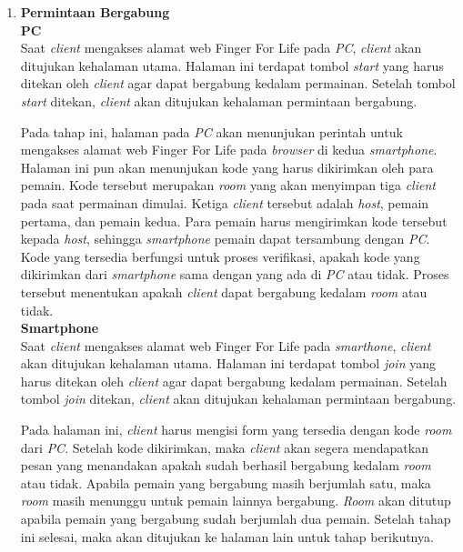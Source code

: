 \begin{enumerate}
	\item \textbf{Permintaan Bergabung} \\
	
	\textbf{PC} \\
	Saat \textit{client} mengakses alamat web Finger For Life pada \textit{PC}, \textit{client} akan ditujukan kehalaman utama. Halaman ini terdapat tombol \textit{start} yang harus ditekan oleh \textit{client} agar dapat bergabung kedalam permainan. Setelah tombol \textit{start} ditekan, \textit{client} akan ditujukan kehalaman permintaan bergabung. 
	
	Pada tahap ini, halaman pada \textit{PC} akan menunjukan perintah untuk mengakses alamat web Finger For Life pada \textit{browser} di kedua \textit{smartphone}. Halaman ini pun akan menunjukan kode yang harus dikirimkan oleh para pemain. Kode tersebut merupakan \textit{room} yang akan menyimpan tiga \textit{client} pada saat permainan dimulai. Ketiga \textit{client} tersebut adalah \textit{host}, pemain pertama, dan pemain kedua. Para pemain harus mengirimkan kode tersebut kepada \textit{host}, sehingga \textit{smartphone} pemain dapat tersambung dengan \textit{PC}. Kode yang tersedia berfungsi untuk proses verifikasi, apakah kode yang dikirimkan dari \textit{smartphone} sama dengan yang ada di \textit{PC} atau tidak. Proses tersebut menentukan apakah \textit{client} dapat bergabung kedalam \textit{room} atau tidak. \\
	
	\textbf{Smartphone} \\
	Saat \textit{client} mengakses alamat web Finger For Life pada \textit{smarthone}, \textit{client} akan ditujukan kehalaman utama. Halaman ini terdapat tombol \textit{join} yang harus ditekan oleh \textit{client} agar dapat bergabung kedalam permainan. Setelah tombol \textit{join} ditekan, \textit{client} akan ditujukan kehalaman permintaan bergabung.
	
	Pada halaman ini, \textit{client} harus mengisi form yang tersedia dengan kode \textit{room} dari \textit{PC}. Setelah kode dikirimkan, maka \textit{client} akan segera mendapatkan pesan yang menandakan apakah sudah berhasil bergabung kedalam \textit{room} atau tidak. Apabila pemain yang bergabung masih berjumlah satu, maka \textit{room} masih menunggu untuk pemain lainnya bergabung. \textit{Room} akan ditutup apabila pemain yang bergabung sudah berjumlah dua pemain. Setelah tahap ini selesai, maka akan ditujukan ke halaman lain untuk tahap berikutnya.
	

\end{enumerate}
